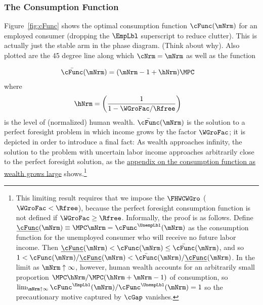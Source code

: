 \documentclass{econark}
\begin{document}
\subsubsection{The Consumption Function}
Figure~\ref{fig:cFunc} shows the optimal consumption function $\cFunc(\mNrm)$ for an
employed consumer (dropping the $\EmpLbl$ superscript to reduce clutter).  This
is actually just the stable arm in the phase diagram.  (Think about
why).  Also plotted are the 45 degree line along which $\cNrm = \mNrm$
as well as the function

\begin{equation}\begin{gathered}\begin{aligned}
  \bar{\cFunc}(\mNrm) & =  (\mNrm-1+\hNrm)\MPC
\end{aligned}\end{gathered}\end{equation}
where
\begin{equation}\begin{gathered}\begin{aligned}
  \hNrm & =  \left(\frac{1}{1-\WGroFac/\Rfree}\right)
\end{aligned}\end{gathered}\end{equation}
is the level of (normalized) human wealth.  $\bar{\cFunc}(\mNrm)$ is the solution to a perfect foresight problem in which income grows by the factor $\WGroFac$; it is depicted in order to introduce a final fact: As wealth approaches infinity, the solution to the problem with uncertain labor income approaches arbitrarily close to the perfect foresight solution, as the \hyperref[sec:PGroGEQRfree]{appendix on the consumption function as wealth grows large} shows.\footnote{This limiting result requires that we impose the $\FHWCWGro$ ($\WGroFac < \Rfree$), because the perfect foresight consumption function is not defined if $\WGroFac \geq \Rfree$.  Informally, the proof is as follows.  Define $\underline{\cFunc}(\mNrm) \equiv \MPC\mNrm=\cFunc^{\UnempLbl}(\mNrm)$ as the consumption function for the unemployed consumer who will receive no future labor income.  Then $\underline{\cFunc}(\mNrm) < \cFunc(\mNrm) \leq \bar{\cFunc}(\mNrm)$, and so $1 < \cFunc(\mNrm)/\underline{\cFunc}(\mNrm)<\bar{\cFunc}(\mNrm)/\underline{\cFunc}(\mNrm)$. In the limit as $\mNrm \uparrow \infty$, however, human wealth accounts for an arbitrarily small proportion $\MPC \hNrm/\MPC (\hNrm+\mNrm-1)$ of consumption, so $\lim_{\mNrm \uparrow \infty} \cFunc^{\EmpLbl}(\mNrm)/\cFunc^{\UnempLbl}(\mNrm) = 1$ so the precautionary motive captured by $\cGap$ vanishes.}
\end{document}
